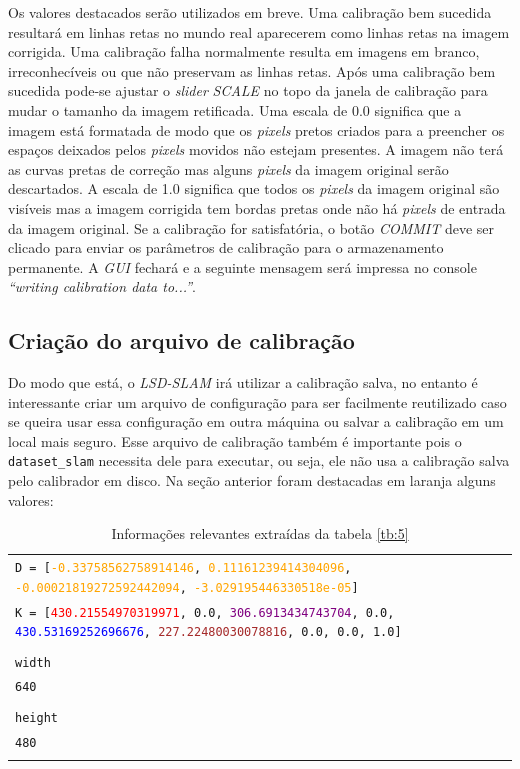 

 
Os valores destacados serão utilizados em breve. Uma calibração bem sucedida resultará em linhas retas no mundo real aparecerem como linhas retas na imagem corrigida. Uma calibração falha normalmente resulta em imagens em branco, irreconhecíveis ou que não preservam as linhas retas.
Após uma calibração bem sucedida pode-se ajustar o \textit{slider} \textit{SCALE} no topo da janela de calibração para mudar o tamanho da imagem retificada. Uma escala de 0.0 significa que a imagem está formatada de modo que os \textit{pixels} pretos criados para a preencher os espaços deixados pelos \textit{pixels} movidos não estejam presentes. A imagem não terá as curvas pretas de correção mas alguns \textit{pixels} da imagem original serão descartados. A escala de 1.0 significa que todos os \textit{pixels} da imagem original são visíveis mas a imagem corrigida tem bordas pretas onde não há \textit{pixels} de entrada da imagem original.
Se a calibração for satisfatória, o botão \textit{COMMIT} deve ser clicado para enviar os parâmetros de calibração para o armazenamento permanente. A \textit{GUI} fechará e a seguinte mensagem será impressa no console \textit{“writing calibration data to...”}.

\subsection{Criação do arquivo de calibração}

Do modo que está, o \textit{LSD-SLAM} irá utilizar a calibração salva, no entanto é interessante criar um arquivo de configuração para ser facilmente reutilizado caso se queira usar essa configuração em outra máquina ou salvar a calibração em um local mais seguro. Esse arquivo de calibração também é importante pois o \texttt{dataset\_slam} necessita dele para executar, ou seja, ele não usa a calibração salva pelo calibrador em disco. Na seção anterior foram destacadas em laranja alguns valores:

\begin{table}[H]\label{tb:6}
\begin{tabular}{| p{\textwidth}|}
\hline
\texttt{D = [\textcolor{orange}{-0.33758562758914146}, \textcolor{orange}{0.11161239414304096}, \textcolor{orange}{-0.00021819272592442094}, \textcolor{orange}{-3.029195446330518e-05}]}\\
\texttt{K = [\textcolor{red}{430.21554970319971}, 0.0, \textcolor{purple}{306.6913434743704}, 0.0, \textcolor{blue}{430.53169252696676}, \textcolor{brown}{227.22480030078816}, 0.0, 0.0, 1.0]}\\
\\
\texttt{width}\\
\texttt{\textcolor{OliveGreen}{640}}\\
\\
\texttt{height}\\
\texttt{\textcolor{WildStrawberry}{480}}\\
\\
\hline
\end{tabular}
\caption{Informações relevantes extraídas da tabela \ref{tb:5}}
\end{table}


